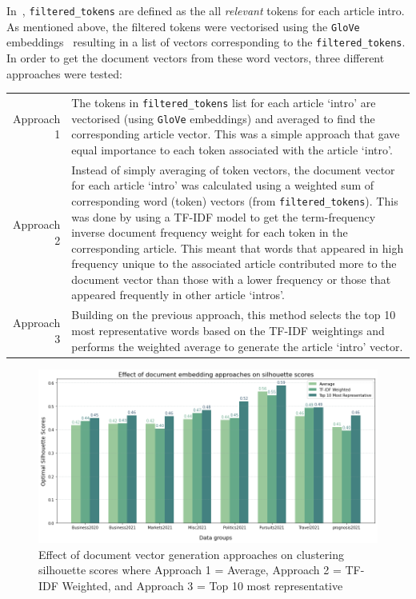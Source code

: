 In~, \texttt{filtered\_tokens} are defined as the all \textit{relevant} tokens for each article intro. As mentioned above, the filtered tokens were vectorised using the \texttt{GloVe} embeddings~\cite{glove} resulting in a list of vectors corresponding to the \texttt{filtered\_tokens}. In order to get the document vectors from these word vectors, three different approaches were tested: 

\renewcommand\arraystretch{2}
\captionsetup{singlelinecheck=false, labelfont=sc, labelsep=quad}
\begin{longtable}{@{\,}r <{\hskip 2pt} !{\foo} >{\arraybackslash}p{14cm}}
\centering

Approach 1 & The tokens in \texttt{filtered\_tokens} list for each article `intro' are vectorised (using \texttt{GloVe} embeddings) and averaged to find the corresponding article vector. This was a simple approach that gave equal importance to each token associated with the article `intro'. \\

Approach 2 & Instead of simply averaging of token vectors, the document vector for each article `intro' was calculated using a weighted sum of corresponding word (token) vectors (from \texttt{filtered\_tokens}). This was done by using a TF-IDF model to get the term-frequency inverse document frequency weight for each token in the corresponding article. This meant that words that appeared in high frequency unique to the associated article contributed more to the document vector than those with a lower frequency or those that appeared frequently in other article `intros'. \\

Approach 3 & Building on the previous approach, this method selects the top 10 most representative words based on the TF-IDF weightings and performs the weighted average to generate the article `intro' vector.\\
\end{longtable}
\vspace{-2ex}
\begin{figure}[H]
  \centering
  \includegraphics[width=0.9\linewidth]{images/eval/doc_embedding_sil.png}
  \caption{Effect of document vector generation approaches on clustering silhouette scores where Approach 1 = Average, Approach 2 = TF-IDF Weighted, and Approach 3 = Top 10 most representative }
  \label{fig:doc_embeddings}
  \end{figure}

